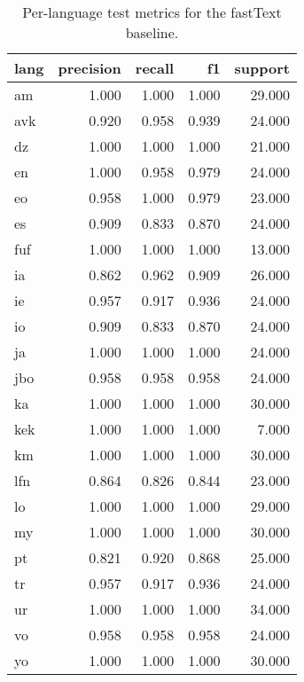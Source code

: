 \begin{table}
\caption{Per-language test metrics for the fastText baseline.}
\label{tab:ft_per_lang}
\begin{tabular}{lrrrr}
\toprule
lang & precision & recall & f1 & support \\
\midrule
am & 1.000 & 1.000 & 1.000 & 29.000 \\
avk & 0.920 & 0.958 & 0.939 & 24.000 \\
dz & 1.000 & 1.000 & 1.000 & 21.000 \\
en & 1.000 & 0.958 & 0.979 & 24.000 \\
eo & 0.958 & 1.000 & 0.979 & 23.000 \\
es & 0.909 & 0.833 & 0.870 & 24.000 \\
fuf & 1.000 & 1.000 & 1.000 & 13.000 \\
ia & 0.862 & 0.962 & 0.909 & 26.000 \\
ie & 0.957 & 0.917 & 0.936 & 24.000 \\
io & 0.909 & 0.833 & 0.870 & 24.000 \\
ja & 1.000 & 1.000 & 1.000 & 24.000 \\
jbo & 0.958 & 0.958 & 0.958 & 24.000 \\
ka & 1.000 & 1.000 & 1.000 & 30.000 \\
kek & 1.000 & 1.000 & 1.000 & 7.000 \\
km & 1.000 & 1.000 & 1.000 & 30.000 \\
lfn & 0.864 & 0.826 & 0.844 & 23.000 \\
lo & 1.000 & 1.000 & 1.000 & 29.000 \\
my & 1.000 & 1.000 & 1.000 & 30.000 \\
pt & 0.821 & 0.920 & 0.868 & 25.000 \\
tr & 0.957 & 0.917 & 0.936 & 24.000 \\
ur & 1.000 & 1.000 & 1.000 & 34.000 \\
vo & 0.958 & 0.958 & 0.958 & 24.000 \\
yo & 1.000 & 1.000 & 1.000 & 30.000 \\
\bottomrule
\end{tabular}
\end{table}
